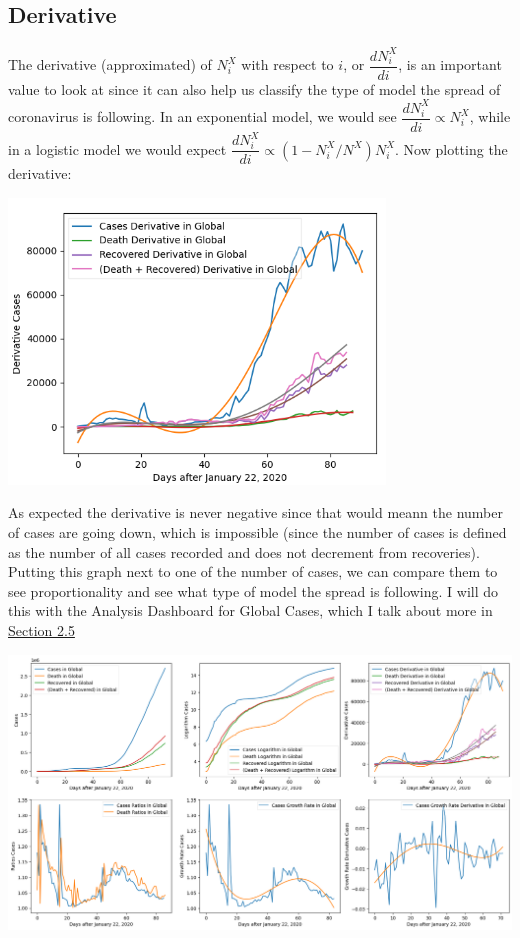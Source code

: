 \documentclass{report}
\begin{document}
        \subsection{Derivative}
            The derivative (approximated) of $N^X_i$ with respect to $i$, or $\dfrac{dN^X_i}{di}$, is an important value to look at since it can also help us classify the type of model the spread of coronavirus is following. In an exponential model, we would see $\dfrac{dN^X_i}{di} \propto N^X_i$, while in a logistic model we would expect $\dfrac{dN^X_i}{di} \propto (1 - N^X_i / N^X)N^X_i$. Now plotting the derivative:
            \begin{center}
                \includegraphics[width=10cm]{plots/global/derivative.png}
            \end{center}
            As expected the derivative is never negative since that would meann the number of cases are going down, which is impossible (since the number of cases is defined as the number of all cases recorded and does not decrement from recoveries).
            \newline
            \indent Putting this graph next to one of the number of cases, we can compare them to see proportionality and see what type of model the spread is following. I will do this with the Analysis Dashboard for Global Cases, which I talk about more in \hyperref[sec:country]{Section 2.5}
            \begin{center}
                \includegraphics[width=\textwidth]{plots/global/analyze.png}
            \end{center}
\end{document}
